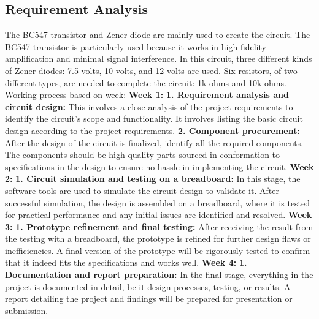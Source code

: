 \subsection{Requirement Analysis}
 The BC547 transistor and Zener diode are mainly used to create the circuit. The BC547 transistor is particularly used because it works in high-fidelity amplification and minimal signal interference. In this circuit, three different kinds of Zener diodes: 7.5 volts, 10 volts, and 12 volts are used. Six resistors, of two different types, are needed to complete the circuit: 1k ohms and 10k ohms. Working process based on week: \newline
 \textbf{Week 1:}\newline
     \textbf{1. Requirement analysis and circuit design:}\newline
     This involves a close analysis of the project requirements to identify the circuit's scope and functionality. It involves listing the basic circuit design according to the project requirements.\newline
    \textbf{2. Component procurement:}\newline
    After the design of the circuit is finalized, identify all the required components. The components should be high-quality parts sourced in conformation to specifications in the design to ensure no hassle in implementing the circuit.\newline
 \textbf{Week 2:}\newline
    \textbf{1. Circuit simulation and testing on a breadboard:}\newline
    In this stage, the software tools are used to simulate the circuit design to validate it. After successful simulation, the design is assembled on a breadboard, where it is tested for practical performance and any initial issues are identified and resolved.\newline
 \textbf{Week 3:}\newline
    \textbf{1. Prototype refinement and final testing:}\newline
    After receiving the result from the testing with a breadboard, the prototype is refined for further design flaws or inefficiencies. A final version of the prototype will be rigorously tested to confirm that it indeed fits the specifications and works well.\newline
    \newline
    \newline
 \textbf{Week 4:}\newline
    \textbf{1. Documentation and report preparation:}\newline
    In the final stage, everything in the project is documented in detail, be it design processes, testing, or results. A report detailing the project and findings will be prepared for presentation or submission.\newline
